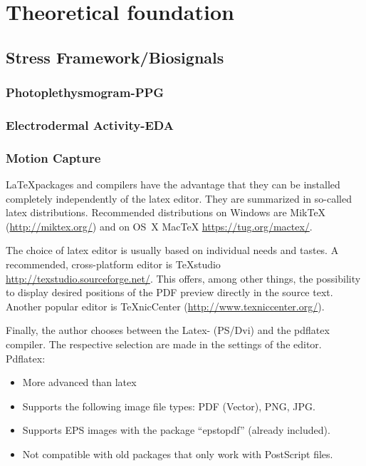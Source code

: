 \chapter{Theoretical foundation}

\section{Stress Framework/Biosignals}
\subsection{Photoplethysmogram-PPG}
\subsection{Electrodermal Activity-EDA}
\subsection{Motion Capture}

\LaTeX packages and compilers have the advantage that they can be installed completely independently of the latex editor.
They are summarized in so-called latex distributions.
Recommended distributions on Windows are MikTeX (\href{http://miktex.org/}{http://miktex.org/}) and on OS~X MacTeX \href{https://tug.org/mactex/}{https://tug.org/mactex/}.

The choice of latex editor is usually based on individual needs and tastes.
A recommended, cross-platform editor is TeXstudio \href{http://texstudio.sourceforge.net/}{http://texstudio.sourceforge.net/}.
This offers, among other things, the possibility to display desired positions of the PDF preview directly in the source text.
Another popular editor is TeXnicCenter (\href{http://www.texniccenter.org/}{http://www.texniccenter.org/}).

Finally, the author chooses between the Latex- (PS/Dvi) and the pdflatex compiler.
The respective selection are made in the settings of the editor. \\

Pdflatex:
\begin{itemize}
	\item More advanced than latex
	\item Supports the following image file types: PDF (Vector), PNG, JPG.
	\item Supports EPS images with the package "`epstopdf"' (already included).
	\item Not compatible with old packages that only work with PostScript files.
\end{itemize}

